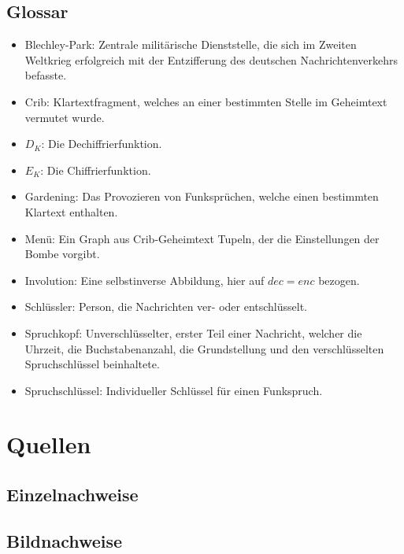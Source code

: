 \documentclass[ngerman, a4paper, footsepline, headsepline]{scrreport}
\begin{document}
	
	
	\newpage
	\section{Glossar}\label{sec:glossar}
	\begin{itemize}
		\item Blechley-Park: Zentrale militärische Dienststelle, die sich im Zweiten Weltkrieg erfolgreich mit der Entzifferung des deutschen Nachrichtenverkehrs befasste.
		\item Crib: Klartextfragment, welches an einer bestimmten Stelle im Geheimtext vermutet wurde.
		\item $D_K$: Die Dechiffrierfunktion.
		\item $E_K$: Die Chiffrierfunktion.
		\item Gardening: Das Provozieren von Funksprüchen, welche einen bestimmten Klartext enthalten.
		\item Menü: Ein Graph aus Crib-Geheimtext Tupeln, der die Einstellungen der Bombe vorgibt.
		\item Involution: Eine selbstinverse Abbildung, hier auf $dec = enc$ bezogen.
		\item Schlüssler: Person, die Nachrichten ver- oder entschlüsselt.
		\item Spruchkopf: Unverschlüsselter, erster Teil einer Nachricht, welcher die Uhrzeit, die Buchstabenanzahl, die Grundstellung und den verschlüsselten Spruchschlüssel beinhaltete.
		\item Spruchschlüssel:  Individueller Schlüssel für einen Funkspruch.
	\end{itemize}
	
	\chapter{Quellen}\label{ch:sources}
	\section{Einzelnachweise}\label{sec:einzelnachweise}
	\printbibliography[keyword=sources, heading=none, title={}]
	\section{Bildnachweise}\label{sec:bildnachweise}
	\printbibliography[keyword=pictures, heading=none, title={}]
	\nocite{*}
	\thispagestyle{plain}
\end{document}
